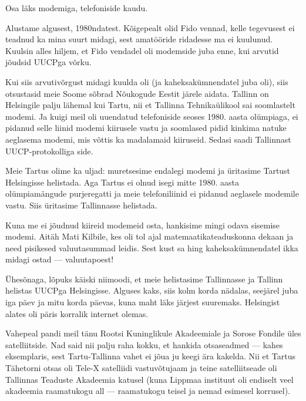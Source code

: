 
Osa läks modemiga, telefoniside kaudu. 


Alustame algusest, 1980ndatest. Kõigepealt 
olid Fido vennad, kelle tegevusest ei teadnud ka mina 
suurt midagi, sest amatööride ridadesse ma ei kuulunud. Kuulsin 
alles hiljem, et Fido vendadel oli modemside juba enne, kui arvutid jõudsid UUCPga 
võrku. 

Kui siis arvutivõrgust midagi kuulda oli (ja kaheksakümnendatel juba
oli), siis otsustasid meie Soome sõbrad Nõukogude Eestit järele 
aidata. Tallinn on Helsingile palju lähemal kui Tartu, nii et Tallinna 
Tehnikaülikool sai soomlastelt modemi. Ja 
kuigi meil oli uuendatud telefoniside seoses 1980. aasta olümpiaga, ei pidanud 
selle liinid modemi kiirusele vastu ja soomlased pidid kinkima natuke 
aeglasema modemi, mis võttis ka madalamaid kiiruseid. Sedasi saadi Tallinnast 
UUCP-protokolliga side. 

Meie Tartus olime ka uljad: muretsesime 
endalegi modemi ja üritasime Tartust Helsingisse helistada. Aga Tartus ei 
olnud isegi mitte 1980. aasta olümpiamängude purjeregatti ja meie telefoniliinid 
ei pidanud aeglasele modemile vastu. Siis üritasime 
Tallinnasse helistada. 

Kuna me ei jõudnud kiireid modemeid osta, hankisime
mingi odava sisemise modemi. Aitäh Mati Kilbile, kes oli tol ajal matemaatikateaduskonna dekaan ja need pisikesed valuutasummad 
leidis. Sest kust sa hing kaheksakümnendatel ikka midagi ostad --- valuutapoest! 

Ühesõnaga, lõpuks käiski niimoodi, et meie helistasime Tallinnasse ja Tallinn helistas UUCPga 
Helsingisse. Alguses kaks, siis kolm korda nädalas, seejärel juba 
iga päev ja mitu korda päevas, kuna maht läks järjest 
suuremaks. Helsingist alates oli päris korralik internet olemas. 


Vahepeal pandi meil tänu Rootsi Kuninglikule Akadeemiale ja 
Sorose Fondile üles satelliitside. Nad said nii palju raha 
kokku, et hankida otsaseadmed --- kahes eksemplaris, sest Tartu-Tallinna vahet ei 
jõua ju keegi ära kakelda. Nii et Tartus Tähetorni otsas oli 
Tele-X satelliidi vastuvõtujaam ja teine satelliitseade oli Tallinnas Teaduste Akadeemia katusel (kuna Lippmaa 
instituut oli endiselt veel 
akadeemia raamatukogu all --- raamatukogu teisel ja nemad 
esimesel korrusel). 

